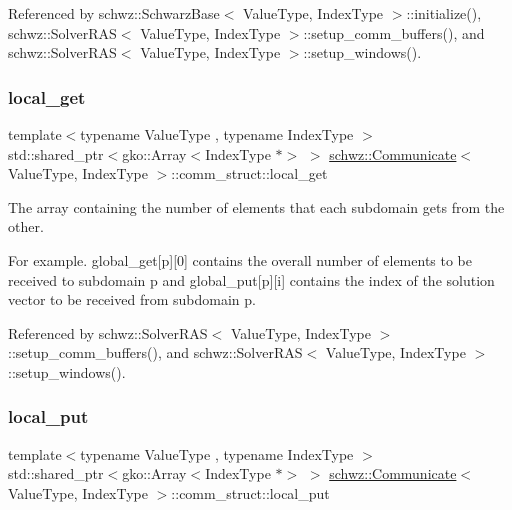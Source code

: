 Referenced by schwz\+::\+Schwarz\+Base$<$ Value\+Type, Index\+Type $>$\+::initialize(), schwz\+::\+Solver\+R\+A\+S$<$ Value\+Type, Index\+Type $>$\+::setup\+\_\+comm\+\_\+buffers(), and schwz\+::\+Solver\+R\+A\+S$<$ Value\+Type, Index\+Type $>$\+::setup\+\_\+windows().

\mbox{\label{structschwz_1_1Communicate_1_1comm__struct_a924b4a6e72c9e9b973c90f9753bc070b}} 
\subsubsection{\texorpdfstring{local\+\_\+get}{local\_get}}
{\footnotesize\ttfamily template$<$typename Value\+Type , typename Index\+Type $>$ \\
std\+::shared\+\_\+ptr$<$gko\+::\+Array$<$Index\+Type $\ast$$>$ $>$ \hyperlink{classschwz_1_1Communicate}{schwz\+::\+Communicate}$<$ Value\+Type, Index\+Type $>$\+::comm\+\_\+struct\+::local\+\_\+get}



The array containing the number of elements that each subdomain gets from the other. 

For example. global\+\_\+get\mbox{[}p\mbox{]}\mbox{[}0\mbox{]} contains the overall number of elements to be received to subdomain p and global\+\_\+put\mbox{[}p\mbox{]}\mbox{[}i\mbox{]} contains the index of the solution vector to be received from subdomain p. 

Referenced by schwz\+::\+Solver\+R\+A\+S$<$ Value\+Type, Index\+Type $>$\+::setup\+\_\+comm\+\_\+buffers(), and schwz\+::\+Solver\+R\+A\+S$<$ Value\+Type, Index\+Type $>$\+::setup\+\_\+windows().

\mbox{\label{structschwz_1_1Communicate_1_1comm__struct_a62a9e5c1988b1bf948148ff2f137a900}} 
\subsubsection{\texorpdfstring{local\+\_\+put}{local\_put}}
{\footnotesize\ttfamily template$<$typename Value\+Type , typename Index\+Type $>$ \\
std\+::shared\+\_\+ptr$<$gko\+::\+Array$<$Index\+Type $\ast$$>$ $>$ \hyperlink{classschwz_1_1Communicate}{schwz\+::\+Communicate}$<$ Value\+Type, Index\+Type $>$\+::comm\+\_\+struct\+::local\+\_\+put}



